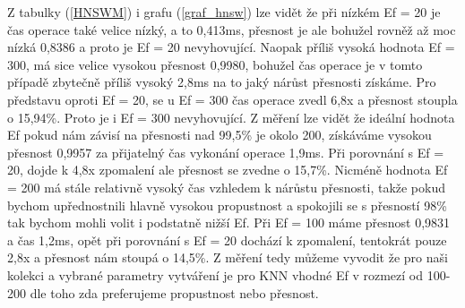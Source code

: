 \documentclass[czech,semestral,dept460,male,csharp,cpdeclaration]{diploma}
\begin{document}
		Z tabulky (\ref{HNSWM}) i grafu (\ref{graf_hnsw}) lze vidět že při nízkém Ef = 20 je čas operace také velice nízký, a to 0,413ms, přesnost je ale bohužel rovněž až moc nízká 0,8386 a proto je Ef = 20 nevyhovující. Naopak příliš vysoká hodnota Ef = 300, má sice velice vysokou přesnost 0,9980, bohužel čas operace je v tomto případě zbytečně příliš vysoký 2,8ms na to jaký nárůst přesnosti získáme. Pro představu oproti Ef = 20, se u Ef = 300 čas operace zvedl 6,8x a přesnost stoupla o 15,94\%. Proto je i Ef = 300 nevyhovující. Z měření lze vidět že ideální hodnota Ef pokud nám závisí na přesnosti nad 99,5\% je okolo 200, získáváme vysokou přesnost 0,9957 za přijatelný čas vykonání operace 1,9ms. Při porovnání s Ef = 20, dojde k 4,8x zpomalení ale přesnost se zvedne o 15,7\%. Nicméně hodnota Ef = 200 má stále relativně vysoký čas vzhledem k nárůstu přesnosti, takže pokud bychom upřednostnili hlavně vysokou propustnost a spokojili se s přesností 98\% tak bychom mohli volit i podstatně nižší Ef. Při Ef = 100 máme přesnost 0,9831 a čas 1,2ms, opět při porovnání s Ef = 20 dochází k zpomalení, tentokrát pouze 2,8x a přesnost nám stoupá o 14,5\%. Z měření tedy můžeme vyvodit že pro naši kolekci a vybrané parametry vytváření je pro KNN vhodné Ef v rozmezí od 100-200 dle toho zda preferujeme propustnost nebo přesnost.
		
\end{document}

